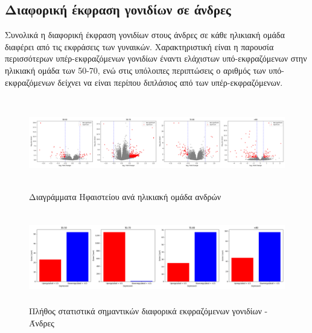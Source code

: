\documentclass[12pt]{report}
\begin{document}
        \subsection{Διαφορική έκφραση γονιδίων σε άνδρες}
        \par
            Συνολικά η διαφορική έκφραση γονιδίων στους άνδρες σε κάθε ηλικιακή ομάδα διαφέρει από τις εκφράσεις των γυναικών. Χαρακτηριστική είναι η παρουσία περισσότερων υπέρ-εκφραζόμενων γονιδίων έναντι ελάχιστων υπό-εκφραζόμενων στην ηλικιακή ομάδα των 50-70, ενώ στις υπόλοιπες περιπτώσεις ο αριθμός των υπό-εκφραζόμενων δείχνει να είναι περίπου διπλάσιος από των υπέρ-εκφραζόμενων.
            \begin{figure}[h]
                \centering
                \includegraphics[width=\textwidth,height=4cm]{Chapter-3/volcano_plot_consoVisits_Male.png}
                \caption{Διαγράμματα Ηφαιστείου ανά ηλικιακή ομάδα ανδρών}
                \label{fig:volcano_plot_consoVisits_Male}
            \end{figure}
            \begin{figure}[H]
                \centering
                \includegraphics[width=\textwidth,height=4cm]{Chapter-3/barplot_plot_consoVisits_Male.png}
                \caption{Πλήθος στατιστικά σημαντικών διαφορικά εκφραζόμενων γονιδίων - Άνδρες}
                \label{fig:barplot_plot_consoVisits_Male}
            \end{figure}
\end{document}

